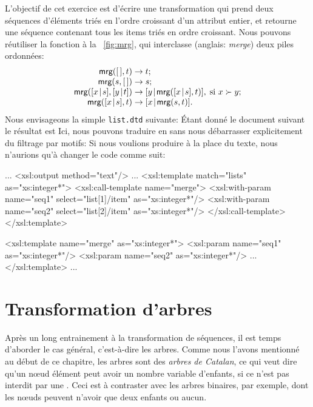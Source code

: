 L'objectif de cet exercice est d'écrire une transformation \XSLT qui
prend deux séquences d'éléments triés en l'ordre croissant d'un
attribut entier, et retourne une séquence contenant tous les items
triés en ordre croissant. Nous pouvons réutiliser la fonction
 à la \fig~\vref{fig:mrg}, qui interclasse (anglais:
\emph{merge}) deux piles ordonnées:
\begin{equation*}
\begin{array}{r@{\;}l@{\;}l}
\fun{mrg}(\el,t)         & \rightarrow & t;\\
\fun{mrg}(s,\el)         & \rightarrow & s;\\
\fun{mrg}(\cons{x}{s},\cons{y}{t}) & \rightarrow
& \cons{y}{\fun{mrg}(\cons{x}{s},t)},\;\text{si \(x \succ y\)};\\
\fun{mrg}(\cons{x}{s},t) & \rightarrow & \cons{x}{\fun{mrg}(s,t)}.
\end{array}
\end{equation*}
Nous envisageons la simple \DTD \texttt{list.dtd} suivante:
\noindent Étant donné le document \XML suivant
\noindent le résultat est
Ici, nous pouvons traduire  en \XSLT sans nous débarrasser
explicitement du filtrage par motifs:
\noindent Si nous voulions produire à la place du texte, nous
n'aurions qu'à changer le code comme suit:
\begin{sverb}
...
  <xsl:output method="text"/>
...
  <xsl:template match="lists" as="xs:integer*">
    <xsl:call-template name="merge">
      <xsl:with-param name="seq1" select="list[1]/item"
                                  as="xs:integer*"/>
      <xsl:with-param name="seq2" select="list[2]/item"
                                  as="xs:integer*"/>
    </xsl:call-template>
  </xsl:template>

  <xsl:template name="merge" as="xs:integer*">
    <xsl:param name="seq1" as="xs:integer*"/>
    <xsl:param name="seq2" as="xs:integer*"/>
    ...
  </xsl:template>
...
\end{sverb}


\section{Transformation d'arbres}

Après un long entrainement à la transformation de séquences, il est
temps d'aborder le cas général, c'est-à-dire les arbres. Comme nous
l'avons mentionné au début de ce chapitre, les arbres \XML sont des
\emph{arbres de Catalan}, ce qui veut dire qu'un nœud élément peut
avoir un nombre variable d'enfants, si ce n'est pas interdit par une
\DTD. Ceci est à contraster avec les arbres binaires, par exemple,
dont les nœuds peuvent n'avoir que deux enfants ou aucun.

